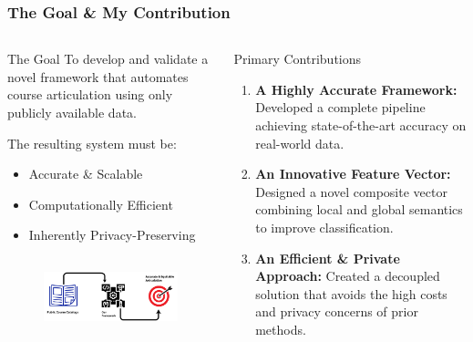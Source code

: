 \documentclass[aspectratio=169,10pt]{beamer}
\begin{document}
\begin{frame}
    \frametitle{The Goal \& My Contribution}
    \vspace{-0.5em}
    \begin{columns}[T]
        \begin{column}{0.47\textwidth}
            \begin{block}{The Goal}
                To develop and validate a novel framework that automates course articulation using only publicly available data.
                
                \vspace{0.5em}
                The resulting system must be:
                \begin{itemize}
                    \item<2-> Accurate \& Scalable
                    \item<3-> Computationally Efficient
                    \item<4-> Inherently Privacy-Preserving
                \end{itemize}
            \end{block}

            \begin{figure}
                \centering
                \includegraphics[height=2.3cm]{equity_goal.pdf}
            \end{figure}

        \end{column}
        
        \begin{column}{0.47\textwidth}
            \begin{block}{Primary Contributions}
                \hfill
                \begin{enumerate}
                    \item<2-> \textbf{A Highly Accurate Framework:} Developed a complete pipeline achieving state-of-the-art accuracy on real-world data.\vspace{0.5em}
                    \item<3-> \textbf{An Innovative Feature Vector:} Designed a novel composite vector combining local and global semantics to improve classification.\vspace{0.5em}
                    \item<4-> \textbf{An Efficient \& Private Approach:} Created a decoupled solution that avoids the high costs and privacy concerns of prior methods.\vspace{1em}
                \end{enumerate}
            \end{block}
        \end{column}
    \end{columns}
    

\end{frame}
\end{document}
